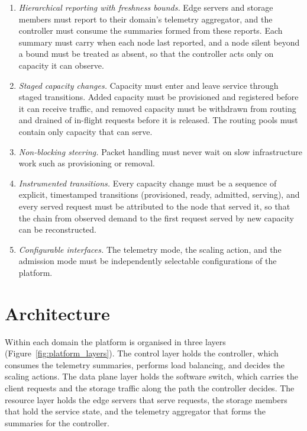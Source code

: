 ﻿\documentclass[12pt,reqno,twoside]{amsbook}
\begin{document}
\begin{enumerate}[label=\textit{DR\arabic*:}, leftmargin=*]
    \item \textit{Hierarchical reporting with freshness bounds.} Edge servers
    and storage members must report to their domain's telemetry aggregator,
    and the controller must consume the summaries formed from these reports.
    Each summary must carry when each node last reported, and a node silent
    beyond a bound must be treated as absent, so that the controller acts
    only on capacity it can observe.

    \item \textit{Staged capacity changes.} Capacity must enter and
    leave service through staged transitions. Added capacity must be
    provisioned and registered before it can receive traffic, and removed
    capacity must be withdrawn from routing and drained of in-flight requests
    before it is released. The routing pools must contain only capacity that
    can serve.

    \item \textit{Non-blocking steering.} Packet handling must never wait on
    slow infrastructure work such as provisioning or removal.

    \item \textit{Instrumented transitions.} Every capacity change must be a
    sequence of explicit, timestamped transitions (provisioned, ready,
    admitted, serving), and every served request must be attributed to the
    node that served it, so that the chain from observed demand to the first
    request served by new capacity can be reconstructed.

    \item \textit{Configurable interfaces.} The telemetry mode, the scaling
    action, and the admission mode must be independently selectable
    configurations of the platform.
\end{enumerate}

\section{Architecture}\label{sec:architecture_overview}
Within each domain the platform is organised in three layers
(Figure~\ref{fig:platform_layers}). The control layer holds the controller,
which consumes the telemetry summaries, performs load balancing, and decides
the scaling actions. The data plane layer holds the software switch, which
carries the client requests and the storage traffic along the path the
controller decides. The resource layer holds the edge servers that
serve requests, the storage members that hold the service state, and the
telemetry aggregator that forms the summaries for the controller.
\end{document}
